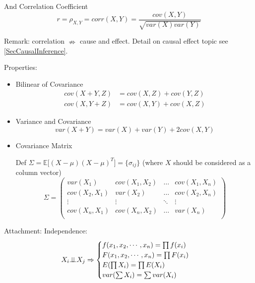     And Correlation Coefficient
    \begin{equation}
        r=\rho_{X,Y}=corr(X,Y)=\frac{cov(X,Y)}{\sqrt{var(X)var(Y)}}
    \end{equation}

    Remark: correlation $\nRightarrow$ cause and effect. 
    Detail on causal effect topic see \autoref{SecCausalInference}.

    Properties:
\begin{itemize}
\item Bilinear of Covariance\begin{align}
    cov(X+Y,Z)&=cov(X,Z)+cov(Y,Z)\\
    cov(X,Y+Z)&=cov(X,Y)+cov(X,Z)
\end{align}
    
\item Variance and Covariance
\begin{equation}\label{EqaVarOfSumOfRV}
    var(X+Y)=var(X)+var(Y)+2cov(X,Y)
\end{equation}
\item Covariance Matrix

    Def $\Sigma=\mathbb{E}\big[(X-\mu)(X-\mu)^T\big]=\{\sigma_{ij}\}$ (where $X$ should be considered as a column vector)
\begin{equation}\label{covariancematrix}
    \Sigma=
        \begin{pmatrix}
        var(X_1) & cov(X_1,X_2) & \ldots & cov(X_1,X_n)\\
        cov(X_2,X_1) & var(X_2) & \ldots & cov(X_2,X_n)\\
        \vdots & \vdots & \ddots & \vdots\\
        cov(X_n,X_1) & cov(X_n,X_2) & \ldots & var(X_n)\\
        \end{pmatrix}    
    \end{equation}
\end{itemize}

Attachment: Independence:\begin{equation}    X_i \bot\!\!\!\bot X_j\Rightarrow \begin{cases}
        f(x_1,x_2,\cdots,x_n)=\prod f(x_i)\\
        F(x_1,x_2,\cdots,x_n)=\prod F(x_i)\\
        E(\prod X_i)=\prod E(X_i)\\
        var(\sum X_i)=\sum var(X_i)
    \end{cases}
\end{equation}


